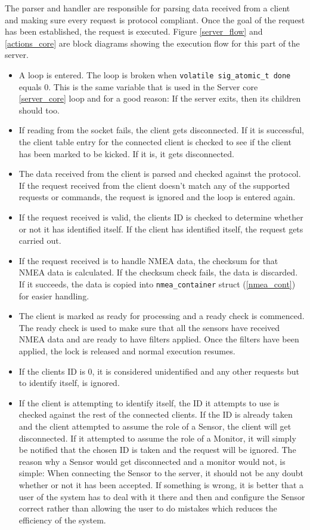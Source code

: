 \documentclass[12pt,english,a4paper]{report}
\begin{document}
The parser and handler are responsible for parsing data received from a client and making sure every request is protocol compliant. Once the goal of the request has been established, the request is executed. Figure \ref{server_flow} and \ref{actions_core} are block diagrams showing the execution flow for this part of the server.  
\begin{itemize}
  \item A loop is entered. The loop is broken when \texttt{volatile sig\_atomic\_t done}\label{atomic_done} equals 0. This is the same variable that is used in the Server core \ref{server_core} loop and for a good reason: If the server exits, then its children should too. 
  \item If reading from the socket fails, the client gets disconnected. If it is successful, the client table entry for the connected client is checked to see if the client has been marked to be kicked. If it is, it gets disconnected. 
  \item The data received from the client is parsed and checked against the protocol. If the request received from the client doesn't match any of the supported requests or commands, the request is ignored and the loop is entered again. 
  \item If the request received is valid, the clients ID is checked to determine whether or not it has identified itself. If the client has identified itself, the request gets carried out. 
  \item If the request received is to handle NMEA data, the checksum for that NMEA data is calculated. If the checksum check fails, the data is discarded. If it succeeds, the data is copied into \texttt{nmea\_container} struct (\ref{nmea_cont}) for easier handling.
  \item The client is marked as ready for processing and a ready check is commenced. The ready check is used to make sure that all the sensors have received NMEA data and are ready to have filters applied. Once the filters have been applied, the lock is released and normal execution resumes.
  \item If the clients ID is 0, it is considered unidentified and any other requests but to identify itself, is ignored.
  \item If the client is attempting to identify itself, the ID it attempts to use is checked against the rest of the connected clients. If the ID is already taken and the client attempted to assume the role of a Sensor, the client will get disconnected. If it attempted to assume the role of a Monitor, it will simply be notified that the chosen ID is taken and the request will be ignored. The reason why a Sensor would get disconnected and a monitor would not, is simple: When connecting the Sensor to the server, it should not be any doubt whether or not it has been accepted. If something is wrong, it is better that a user of the system has to deal with it there and then and configure the Sensor correct rather than allowing the user to do mistakes which reduces the efficiency of the system. 

\end{itemize}
\end{document}

